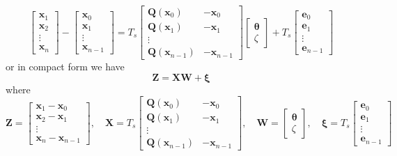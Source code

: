 \documentclass[12pt]{iopart}
\begin{document}
\begin{equation}
	\left[
	\begin{array}{cccc}
		\mathbf x_{1}\\\mathbf x_{2}\\\vdots\\\mathbf x_{n}
	\end{array}
	\right] -\left[
	\begin{array}{cccc}
		\mathbf x_{0}\\\mathbf x_{1}\\\vdots\\\mathbf x_{n-1}
	\end{array}
	\right] =T_s\left[
	\begin{array}{cc}
		\mathbf Q(\mathbf x_0)&-\mathbf x_{0}\\\mathbf Q(\mathbf x_1)&-\mathbf x_{1}\\\vdots\\
		\mathbf Q(\mathbf x_{n-1})&-\mathbf x_{n-1}
	\end{array}
	\right] \left[
	\begin{array}{cc}
		\boldsymbol{\theta} \\
		\zeta
	\end{array}
	\right]+T_s \left[
	\begin{array}{cccc}
		\mathbf e_0\\\mathbf e_1\\\vdots\\\mathbf e_{n-1}
	\end{array}
	\right] 
\end{equation}
or in compact form we have 
\begin{equation}
	\mathbf Z=\mathbf X \mathbf W+\boldsymbol \xi 
\end{equation}
where 
\begin{equation}
	\mathbf Z=\left[
	\begin{array}{cccc}
		\mathbf x_{1}-\mathbf x_{0}\\
		\mathbf x_{2}-\mathbf x_{1}\\\vdots\\
		\mathbf x_{n}-\mathbf x_{n-1}
	\end{array}
	\right],\quad \mathbf X=T_s\left[
	\begin{array}{cccc}
		\mathbf Q(\mathbf x_0)&-\mathbf x_{0}\\
		\mathbf Q(\mathbf x_1)&-\mathbf x_{1}\\\vdots\\
		\mathbf Q(\mathbf x_{n-1})&-\mathbf x_{n-1}
	\end{array}
	\right] ,\quad \mathbf W=\left[
	\begin{array}{cc}
		\boldsymbol{\theta} \\
		\zeta
	\end{array}
	\right],\quad \boldsymbol \xi=T_s\left[
	\begin{array}{cccc}
		\mathbf e_0\\\mathbf e_1\\\vdots\\\mathbf e_{n-1}
	\end{array}
	\right] 
\end{equation}
\end{document}
